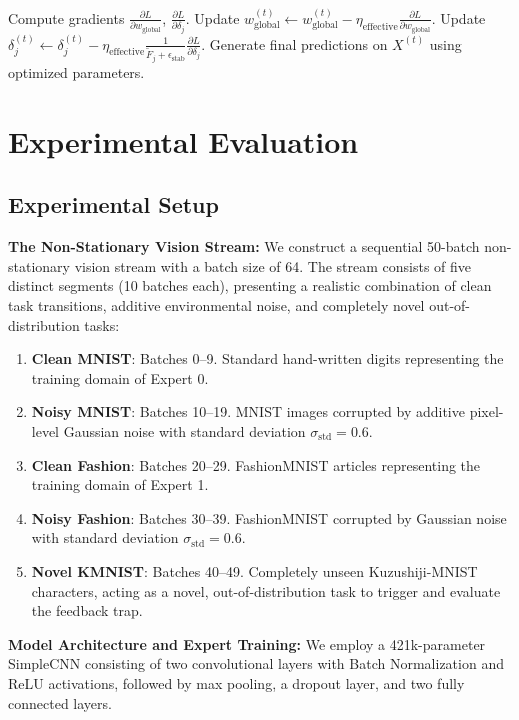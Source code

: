\documentclass{article}
\theoremstyle{plain}
\theoremstyle{definition}
\theoremstyle{remark}
\begin{document}
\begin{algorithm*}[t]
\begin{algorithmic}[1]
        \STATE Compute gradients $\frac{\partial L}{\partial w_{\text{global}}}$, $\frac{\partial L}{\partial \delta_j}$.
        \STATE Update $w_{\text{global}}^{(t)} \leftarrow w_{\text{global}}^{(t)} - \eta_{\text{effective}} \frac{\partial L}{\partial w_{\text{global}}}$.
        \STATE Update $\delta_j^{(t)} \leftarrow \delta_j^{(t)} - \eta_{\text{effective}} \frac{1}{\tilde{F}_j + \epsilon_{\text{stab}}} \frac{\partial L}{\partial \delta_j}$.
    \ENDFOR
    \STATE Generate final predictions on $X^{(t)}$ using optimized parameters.
\ENDFOR
\end{algorithmic}
\end{algorithm*}

\section{Experimental Evaluation}
\label{sec:exp}

\subsection{Experimental Setup}
\textbf{The Non-Stationary Vision Stream:} We construct a sequential 50-batch non-stationary vision stream with a batch size of 64. The stream consists of five distinct segments (10 batches each), presenting a realistic combination of clean task transitions, additive environmental noise, and completely novel out-of-distribution tasks:
\begin{enumerate}
    \item \textbf{Clean MNIST}: Batches 0--9. Standard hand-written digits representing the training domain of Expert 0.
    \item \textbf{Noisy MNIST}: Batches 10--19. MNIST images corrupted by additive pixel-level Gaussian noise with standard deviation $\sigma_{\text{std}} = 0.6$.
    \item \textbf{Clean Fashion}: Batches 20--29. FashionMNIST articles representing the training domain of Expert 1.
    \item \textbf{Noisy Fashion}: Batches 30--39. FashionMNIST corrupted by Gaussian noise with standard deviation $\sigma_{\text{std}} = 0.6$.
    \item \textbf{Novel KMNIST}: Batches 40--49. Completely unseen Kuzushiji-MNIST characters, acting as a novel, out-of-distribution task to trigger and evaluate the feedback trap.
\end{enumerate}

\textbf{Model Architecture and Expert Training:} We employ a 421k-parameter SimpleCNN consisting of two convolutional layers with Batch Normalization and ReLU activations, followed by max pooling, a dropout layer, and two fully connected layers. 
\end{document}
